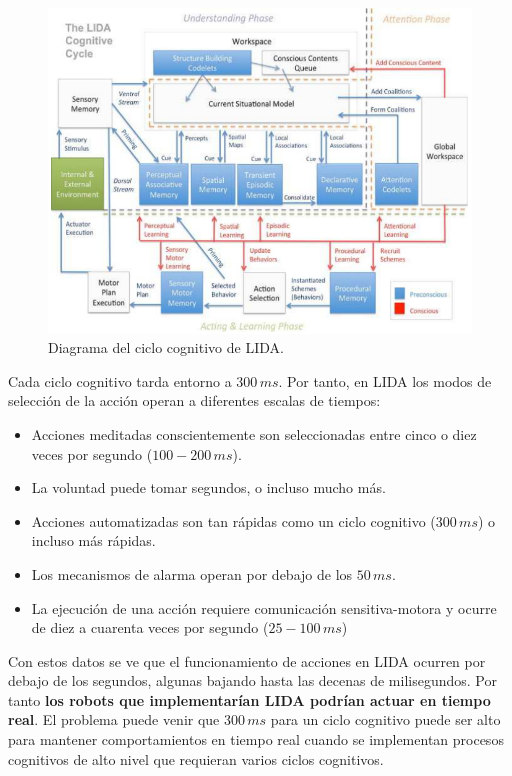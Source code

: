 \documentclass[a4paper, fontsize=11pt]{scrartcl} %
\numberwithin{equation}{section} %
\numberwithin{figure}{section} %
\numberwithin{table}{section} %
\begin{document}
	\begin{figure}[h!]
		\centering
		\includegraphics[width=0.8\linewidth]{images/LIDA.png}
		\caption{Diagrama del ciclo cognitivo de LIDA\cite{LIDA}.}
		\label{LIDA}
	\end{figure}
	\FloatBarrier
	
	Cada ciclo cognitivo tarda entorno a \textbf{$300\,ms$}. Por tanto, en LIDA los modos de selección de la acción operan a diferentes escalas de tiempos:
	
	\begin{itemize}
		\item  Acciones meditadas conscientemente son seleccionadas entre cinco o diez veces por segundo (\textbf{$100-200\,ms$}).
		\item La voluntad puede tomar segundos, o incluso mucho más.
		\item Acciones automatizadas son tan rápidas como un ciclo cognitivo (\textbf{$300\,ms$}) o incluso más rápidas.
		\item  Los mecanismos de alarma operan por debajo de los \textbf{$50\,ms$}.
		\item La ejecución de una acción requiere comunicación sensitiva-motora y ocurre de diez a cuarenta veces por segundo (\textbf{$25-100\,ms$})
	\end{itemize}
	
	Con estos datos se ve que el funcionamiento de acciones en LIDA ocurren por debajo de los segundos, algunas bajando hasta las decenas de milisegundos. Por tanto \textbf{los robots que implementarían LIDA podrían actuar en tiempo real}. El problema puede venir que $300\,ms$ para un ciclo cognitivo puede ser alto para mantener comportamientos en tiempo real cuando se implementan procesos cognitivos de alto nivel que requieran varios ciclos cognitivos.\\
	
\end{document}
